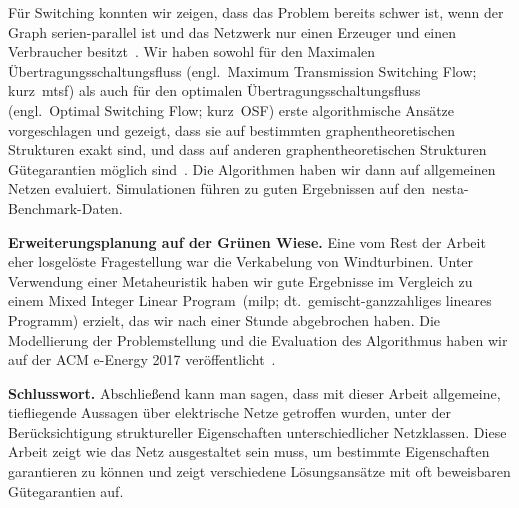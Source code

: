 F{\"u}r Switching konnten wir zeigen, dass das Problem bereits schwer ist, wenn
der Graph serien-parallel ist und das Netzwerk nur einen Erzeuger und einen
Verbraucher besitzt~\parencite{Gra18}. Wir haben sowohl für den Maximalen
{\"U}bertragungsschaltungsfluss (engl.\ Maximum Transmission Switching Flow;
kurz~\gls{mtsf}) als auch für den optimalen {\"U}bertragungsschaltungsfluss
(engl.\ Optimal Switching Flow; kurz~OSF) erste algorithmische Ans{\"a}tze
vorgeschlagen und gezeigt, dass sie auf bestimmten graphentheoretischen
Strukturen exakt sind, und dass auf anderen graphentheoretischen Strukturen
G{\"u}tegarantien m{\"o}glich sind~\parencite{Gra18}. Die Algorithmen haben wir
dann auf allgemeinen Netzen evaluiert. Simulationen führen zu guten Ergebnissen
auf den~\gls{nesta}-Benchmark-Daten.

\textbf{Erweiterungsplanung auf der Gr{\"u}nen Wiese.} Eine vom Rest der 
Arbeit eher losgel{\"o}ste Fragestellung war die Verkabelung von Windturbinen.
Unter Verwendung einer Metaheuristik haben wir gute Ergebnisse im Vergleich zu
einem \glqq Mixed Integer Linear Program\grqq\ (\gls{milp}; dt.\
gemischt-ganzzahliges lineares Programm) erzielt, das wir nach einer Stunde
abgebrochen haben. Die Modellierung der Problemstellung und die Evaluation des
Algorithmus haben wir auf der ACM e-Energy 2017
ver{\"o}ffentlicht~\parencite{Leh17}.

\textbf{Schlusswort.} Abschlie{\ss}end kann man sagen, dass mit dieser Arbeit
allgemeine, tiefliegende Aussagen {\"u}ber elektrische Netze getroffen wurden,
unter der Ber{\"u}cksichtigung struktureller Eigenschaften unterschiedlicher
Netzklassen. Diese Arbeit zeigt wie das Netz ausgestaltet sein muss, um
bestimmte Eigenschaften garantieren zu k{\"o}nnen und zeigt verschiedene
L{\"o}sungsans{\"a}tze mit oft beweisbaren G{\"u}tegarantien auf. 